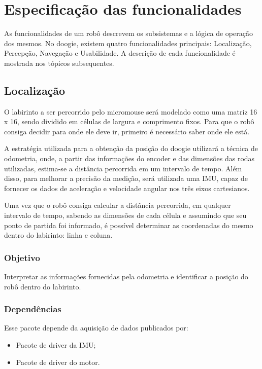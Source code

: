 \section{Especificação das funcionalidades}
\label{sec:especificacao_das_funcionalidades}
As funcionalidades de um robô descrevem os subsistemas e a lógica de operação dos mesmos. No doogie, existem quatro funcionalidades principais: Localização, Percepção, Navegação e Usabilidade. A descrição de cada funcionalidade é mostrada nos tópicos subsequentes.

\subsection{Localização}
\label{ssec:funcionalidade_localizacao}
O labirinto a ser percorrido pelo micromouse será modelado como uma matriz 16 x 16, sendo dividido em células de largura e comprimento fixos. Para que o robô consiga decidir para onde ele deve ir, primeiro é necessário saber onde ele está.

A estratégia utilizada para a obtenção da posição do doogie utilizará a técnica de odometria, onde, a partir das informações do encoder e das dimensões das rodas utilizadas, estima-se a distância percorrida em um intervalo de tempo. Além disso, para melhorar a precisão da medição, será utilizada uma IMU, capaz de fornecer os dados de aceleração e velocidade angular nos três eixos cartesianos.

Uma vez que o robô consiga calcular a distância percorrida, em qualquer intervalo de tempo, sabendo as dimensões de cada célula e assumindo que seu ponto de partida foi informado, é possível determinar as coordenadas do mesmo dentro do labirinto: linha e coluna. 

\subsubsection{Objetivo}
Interpretar as informações fornecidas pela odometria e identificar a posição do robô dentro do labirinto.

\subsubsection{Dependências}
Esse pacote depende da aquisição de dados publicados por:
\begin{itemize}
	\item Pacote de driver da IMU;
	\item Pacote de driver do motor.
\end{itemize}
	
